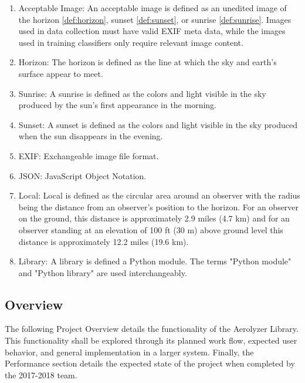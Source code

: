 \documentclass[journal,10pt,draftclsnofoot,onecolumn]{IEEEtran}
\begin{document}
\begin{singlespace}
\begin{enumerate}
			\item \label{def:accImg} Acceptable Image:
			An acceptable image is defined as an unedited image of the horizon \ref{def:horizon}, sunset \ref{def:sunset}, or sunrise \ref{def:sunrise}.
			Images used in data collection must have valid EXIF meta data, while the images used in training classifiers only require relevant image content.

			\item \label{def:horizon} Horizon:
			The horizon is defined as the line at which the sky and earth's surface appear to meet.

			\item \label{def:sunrise} Sunrise:
			A sunrise is defined as the colors and light visible in the sky produced by the sun's first appearance in the morning.

			\item \label{def:sunset} Sunset:
			A sunset is defined as the colors and light visible in the sky produced when the sun disappears in the evening.

			\item \label{def:exif} EXIF:
			Exchangeable image file format.

			\item \label{def:json} JSON:
			JavaScript Object Notation.

			\item \label{def:local} Local:
			Local is defined as the circular area around an observer with the radius being the distance from an observer's position to the horizon.
			For an observer on the ground, this distance is approximately 2.9 miles (4.7 km) and for an observer standing at an elevation of 100 ft (30 m) above ground level this distance is approximately 12.2 miles (19.6 km).

			\item \label{def:lib} Library:
			A library is defined a Python module. The terms "Python module" and "Python library" are used interchangeably.
		\end{enumerate}

	\nocite{*}
	
	

	\subsection{Overview}
		The following Project Overview details the functionality of the Aerolyzer Library.
		This functionality shall be explored through its planned work flow, expected user behavior, and general implementation in a larger system.
		Finally, the Performance section details the expected state of the project when completed by the 2017-2018 team.


\end{singlespace}
\end{document}
